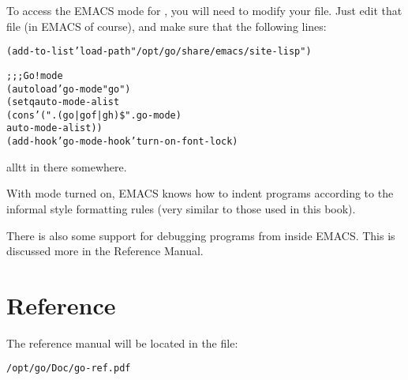 To access the EMACS mode for \go, you will need to modify your  file. Just edit that file (in EMACS of course), and make sure that the following lines:
\begin{alltt}
(add-to-list 'load-path "/opt/go/share/emacs/site-lisp")

;;; Go! mode
(autoload 'go-mode "go")
(setq auto-mode-alist 
  (cons '("\bsl\bsl.\bsl\bsl(go\bsl\bsl|gof\bsl\bsl|gh\bsl\bsl)\$" . go-mode) 
    auto-mode-alist))
(add-hook 'go-mode-hook 'turn-on-font-lock)
\end{alltt}
alltt in there somewhere.

With \go mode turned on, EMACS knows how to indent \go programs according to the informal style formatting rules (very similar to those used in this book).

There is also some support for debugging \go programs from inside EMACS. This is discussed more in the \go Reference Manual.

\section{\go Reference}
The \go reference manual will be located in the file:
\begin{alltt}
/opt/go/Doc/go-ref.pdf
\end{alltt}


